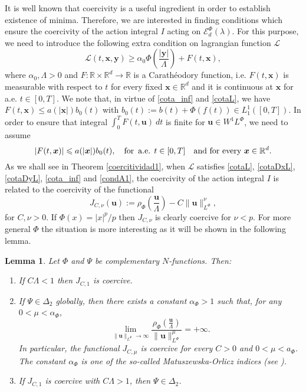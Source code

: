 \documentclass[twoside]{article}
\newtheorem{lem}[thm]{Lemma}
\theoremstyle{remark}
\newcommand{\orlnor}{\|_{L^{\Phi}}}
\newcommand{\lphi}{L^{\Phi}}
\newcommand{\wphi}{W^{1}\lphi}
\newcommand{\domi}{\mathcal{E}^{\Phi}_d(\lambda)}
\renewcommand{\b}[1]{\boldsymbol{#1}}
\newcommand{\rr}{\mathbb{R}}
\renewcommand{\leq}{\leqslant}
\begin{document}
It is well known that coercivity is a useful ingredient in order to establish existence of minima. Therefore, we are interested in finding conditions which ensure the coercivity of the action integral $I$ acting on $\domi$. For this purpose, we need to introduce the following  extra condition on lagrangian function $\mathcal{L}$  
\begin{equation}\label{cota_inf}
\mathcal{L}(t,\b{x},\b{y})\geq \alpha_0\Phi\left(\frac{|\b{y}|}{\Lambda}\right)+ F(t,\b{x}),
\end{equation}
where $\alpha_0,\Lambda>0$ and  $F:\rr\times\rr^d\to\rr$ is a Carath\'eodory function, i.e. $F(t,\b{x})$ is  measurable with respect to $t$ for every fixed  $\b{x}\in\rr^d$ and it is continuous at $\b{x}$ for a.e. $t\in [0,T]$. We note that, in virtue of \eqref{cota_inf} and \eqref{cotaL}, we have $F(t,\b{x})\leq a(|\b{x}|)b_0(t)$  with $b_0(t):=b(t)+\Phi(f(t))\in L^1_1([0,T])$. In order to ensure that integral $\int_0^TF(t,\b{u})\ dt$ is finite for $\b{u}\in\wphi$,  we need to assume 
\begin{equation}\label{condA1} |F(t,\b{x})|\leq a(|\b{x}|)b_0(t),\quad\text{for \,a.e. }t\in [0,T] \quad\text{and for every } \b{x}\in\rr^d.
\end{equation}
As we shall see in Theorem \ref{coercitividad1}, when $\mathcal{L}$ satisfies \eqref{cotaL}, \eqref{cotaDxL}, \eqref{cotaDyL}, \eqref{cota_inf} and \eqref{condA1},  the coercivity of the action integral $I$ is related to the coercivity of the functional
\begin{equation}\label{func_phi}
  J_{C,\nu}(\b{u}):= \rho_{\Phi}\left(\frac{\b{u}}{\Lambda}\right)-C\|\b{u}\orlnor^{\nu},
\end{equation}
for $C,\nu>0$. If $\Phi(x)=|x|^p/p$ then $J_{C,\nu}$ is clearly coercive for $\nu<p$. For more general $\Phi$ the situation is more interesting   as it will be shown in the following lemma.

\begin{lem}\label{lem_coer} Let $\Phi$ and $\Psi$ be complementary $N$-functions. Then:
\begin{enumerate}
  \item If $C\Lambda<1$ then $J_{C,1}$ is coercive. 
  
  \item If $\Psi \in \Delta_2$ globally, then there exists a constant $\alpha_{\Phi}>1$ such that, for any $0<\mu<\alpha_{\Phi}$,
\begin{equation}\label{coer_modular} \lim\limits_{\|\b{u}\orlnor \to \infty} \frac{\rho_{\Phi}\left(\frac{\b{u}}{\Lambda}\right)}{\|\b{u}\orlnor^{\mu}}=+\infty.
\end{equation}
In particular, the functional $J_{C,\mu}$ is coercive for every $C>0$ and  $0<\mu<a_{\Phi}$. The constant $\alpha_{\Phi}$ is one of the so-called \emph{ Matuszewska-Orlicz indices} (see \cite[Ch. 11]{M}).
\item If $J_{C,1}$ is coercive with $C\Lambda>1$, then $\Psi \in \Delta_2$.  
\end{enumerate}
\end{lem}
\end{document}
